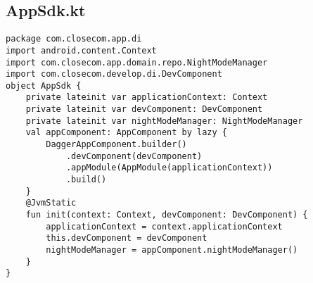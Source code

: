 \documentclass[listing]{espd}
\begin{document}
\subsection{AppSdk.kt}
\begin{verbatim}
package com.closecom.app.di
import android.content.Context
import com.closecom.app.domain.repo.NightModeManager
import com.closecom.develop.di.DevComponent
object AppSdk {
    private lateinit var applicationContext: Context
    private lateinit var devComponent: DevComponent
    private lateinit var nightModeManager: NightModeManager
    val appComponent: AppComponent by lazy {
        DaggerAppComponent.builder()
            .devComponent(devComponent)
            .appModule(AppModule(applicationContext))
            .build()
    }
    @JvmStatic
    fun init(context: Context, devComponent: DevComponent) {
        applicationContext = context.applicationContext
        this.devComponent = devComponent
        nightModeManager = appComponent.nightModeManager()
    }
}
\end{verbatim}
\end{document}
